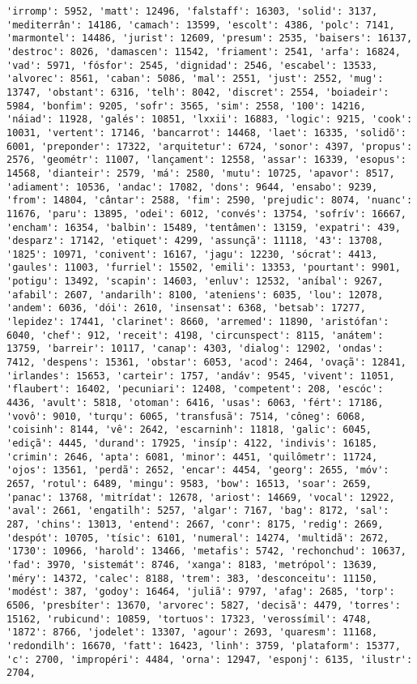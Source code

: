 \begin{Verbatim}[commandchars=\\\{\}]
'irromp': 5952, 'matt': 12496, 'falstaff': 16303, 'solid': 3137, 'mediterrân': 14186, 'camach': 13599, 'escolt': 4386, 'polc': 7141, 'marmontel': 14486, 'jurist': 12609, 'presum': 2535, 'baisers': 16137, 'destroc': 8026, 'damascen': 11542, 'friament': 2541, 'arfa': 16824, 'vad': 5971, 'fósfor': 2545, 'dignidad': 2546, 'escabel': 13533, 'alvorec': 8561, 'caban': 5086, 'mal': 2551, 'just': 2552, 'mug': 13747, 'obstant': 6316, 'telh': 8042, 'discret': 2554, 'boiadeir': 5984, 'bonfim': 9205, 'sofr': 3565, 'sim': 2558, '100': 14216, 'náiad': 11928, 'galés': 10851, 'lxxii': 16883, 'logic': 9215, 'cook': 10031, 'vertent': 17146, 'bancarrot': 14468, 'laet': 16335, 'solidõ': 6001, 'preponder': 17322, 'arquitetur': 6724, 'sonor': 4397, 'propus': 2576, 'geométr': 11007, 'lançament': 12558, 'assar': 16339, 'esopus': 14568, 'dianteir': 2579, 'má': 2580, 'mutu': 10725, 'apavor': 8517, 'adiament': 10536, 'andac': 17082, 'dons': 9644, 'ensabo': 9239, 'from': 14804, 'cântar': 2588, 'fim': 2590, 'prejudic': 8074, 'nuanc': 11676, 'paru': 13895, 'odei': 6012, 'convés': 13754, 'sofrív': 16667, 'encham': 16354, 'balbin': 15489, 'tentâmen': 13159, 'expatri': 439, 'desparz': 17142, 'etiquet': 4299, 'assunçã': 11118, '43': 13708, '1825': 10971, 'conivent': 16167, 'jagu': 12230, 'sócrat': 4413, 'gaules': 11003, 'furriel': 15502, 'emili': 13353, 'pourtant': 9901, 'potigu': 13492, 'scapin': 14603, 'enluv': 12532, 'aníbal': 9267, 'afabil': 2607, 'andarilh': 8100, 'ateniens': 6035, 'lou': 12078, 'andem': 6036, 'dói': 2610, 'insensat': 6368, 'betsab': 17277, 'lepidez': 17441, 'clarinet': 8660, 'arremed': 11890, 'aristófan': 6040, 'chef': 912, 'receit': 4198, 'circunspect': 8115, 'anátem': 13759, 'barreir': 10117, 'canap': 4303, 'dialog': 12902, 'ondas': 7412, 'despens': 15361, 'obstar': 6053, 'acod': 2464, 'ovaçã': 12841, 'irlandes': 15653, 'carteir': 1757, 'andáv': 9545, 'vivent': 11051, 'flaubert': 16402, 'pecuniari': 12408, 'competent': 208, 'escóc': 4436, 'avult': 5818, 'otoman': 6416, 'usas': 6063, 'fért': 17186, 'vovô': 9010, 'turqu': 6065, 'transfusã': 7514, 'côneg': 6068, 'coisinh': 8144, 'vê': 2642, 'escarninh': 11818, 'galic': 6045, 'ediçã': 4445, 'durand': 17925, 'insíp': 4122, 'indivis': 16185, 'crimin': 2646, 'apta': 6081, 'minor': 4451, 'quilômetr': 11724, 'ojos': 13561, 'perdã': 2652, 'encar': 4454, 'georg': 2655, 'móv': 2657, 'rotul': 6489, 'mingu': 9583, 'bow': 16513, 'soar': 2659, 'panac': 13768, 'mitrídat': 12678, 'ariost': 14669, 'vocal': 12922, 'aval': 2661, 'engatilh': 5257, 'algar': 7167, 'bag': 8172, 'sal': 287, 'chins': 13013, 'entend': 2667, 'conr': 8175, 'redig': 2669, 'despót': 10705, 'tísic': 6101, 'numeral': 14274, 'multidã': 2672, '1730': 10966, 'harold': 13466, 'metafis': 5742, 'rechonchud': 10637, 'fad': 3970, 'sistemát': 8746, 'xanga': 8183, 'metrópol': 13639, 'méry': 14372, 'calec': 8188, 'trem': 383, 'desconceitu': 11150, 'modést': 387, 'godoy': 16464, 'juliã': 9797, 'afag': 2685, 'torp': 6506, 'presbíter': 13670, 'arvorec': 5827, 'decisã': 4479, 'torres': 15162, 'rubicund': 10859, 'tortuos': 17323, 'verossímil': 4748, '1872': 8766, 'jodelet': 13307, 'agour': 2693, 'quaresm': 11168, 'redondilh': 16670, 'fatt': 16423, 'linh': 3759, 'plataform': 15377, 'c': 2700, 'impropéri': 4484, 'orna': 12947, 'esponj': 6135, 'ilustr': 2704, 
\end{Verbatim}
